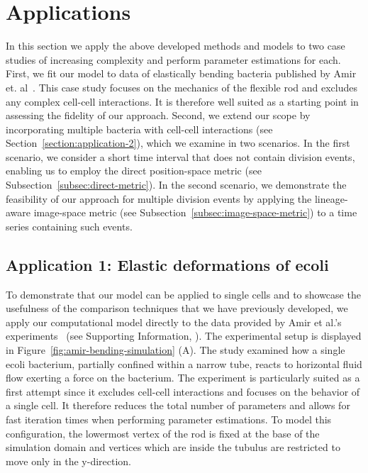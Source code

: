 \section{Applications}
In this section we apply the above developed methods and models to two case studies of increasing
complexity and perform parameter estimations for each.
First, we fit our model to data of elastically bending bacteria published by Amir et.
al~\cite{Amir2014,Amir2014_2}.
This case study focuses on the mechanics of the flexible rod and excludes any complex cell-cell
interactions.
It is therefore well suited as a starting point in assessing the fidelity of our approach.
Second, we extend our scope by incorporating multiple bacteria with cell-cell interactions
(see Section~\ref{section:application-2}), which we examine in two scenarios.
In the first scenario, we consider a short time interval that does not contain division events,
enabling us to employ the direct position-space metric (see Subsection~\ref{subsec:direct-metric}).
In the second scenario, we demonstrate the feasibility of our approach for multiple division
events by applying the lineage-aware image-space metric (see
Subsection~\ref{subsec:image-space-metric}) to a time series containing such events.

\subsection{Application 1: Elastic deformations of \acl{ecoli}}
\label{sec:application-1-amir}
To demonstrate that our model can be applied to single cells and to showcase the usefulness
of the comparison techniques that we have previously developed, we apply our computational
model directly to the data provided by Amir et al.'s experiments~\cite{Amir2014,Amir2014_2}
(see Supporting Information, ).
The experimental setup is displayed in Figure~\ref{fig:amir-bending-simulation} (A).
The study examined how a single \ac{ecoli} bacterium, partially confined within a narrow tube,
reacts to horizontal fluid flow exerting a force on the bacterium.
The experiment is particularly suited as a first attempt since it excludes cell-cell interactions
and focuses on the behavior of a single cell.
It therefore reduces the total number of parameters and allows for fast iteration times when
performing parameter estimations.
To model this configuration, the lowermost vertex of the rod is fixed at the base of the simulation
domain and vertices which are inside the tubulus are restricted to move only in the y-direction.

